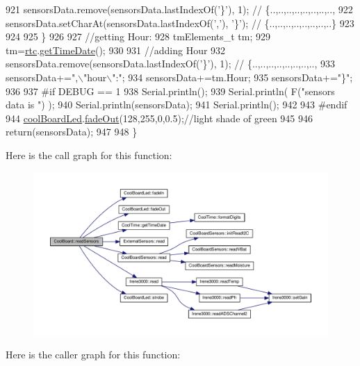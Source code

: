 \begin{DoxyCode}
921         sensorsData.remove(sensorsData.lastIndexOf(\textcolor{charliteral}{'\}'}), 1); \textcolor{comment}{// \{..,..,..,..,..,..,..,..,}
922         sensorsData.setCharAt(sensorsData.lastIndexOf(\textcolor{charliteral}{','}), \textcolor{charliteral}{'\}'}); \textcolor{comment}{// \{..,..,..,..,..,..,..,..\}      }
923         
924         
925     \}
926 
927     \textcolor{comment}{//getting Hour:}
928     tmElements\_t tm;
929     tm=\hyperlink{classCoolBoard_a50d2a6716879d64a85f3c6b44ad63275}{rtc}.\hyperlink{classCoolTime_a7a7501c5ca77dd1248bea704c44f986c}{getTimeDate}();
930     
931     \textcolor{comment}{//adding Hour}
932     sensorsData.remove(sensorsData.lastIndexOf(\textcolor{charliteral}{'\}'}), 1); \textcolor{comment}{// \{..,..,..,..,..,..,..,..,   }
933     sensorsData+=\textcolor{stringliteral}{",\(\backslash\)"hour\(\backslash\)":"};  
934     sensorsData+=tm.Hour;
935     sensorsData+=\textcolor{stringliteral}{"\}"};
936     
937 \textcolor{preprocessor}{#if DEBUG == 1}
938     Serial.println();
939     Serial.println( F(\textcolor{stringliteral}{"sensors data is "}) );
940     Serial.println(sensorsData);
941     Serial.println();
942 
943 \textcolor{preprocessor}{#endif}
944     \hyperlink{classCoolBoard_a1b1d3c684a5baa56b08486e192fd8e97}{coolBoardLed}.\hyperlink{classCoolBoardLed_a93d545679237e8cc858324367149775c}{fadeOut}(128,255,0,0.5);\textcolor{comment}{//light shade of green}
945 
946     \textcolor{keywordflow}{return}(sensorsData);
947 
948 \}
\end{DoxyCode}
Here is the call graph for this function\+:\nopagebreak
\begin{figure}[H]
\begin{center}
\leavevmode
\includegraphics[width=350pt]{classCoolBoard_ad03abdce2e65f520bbf2cff0f2d083cf_cgraph}
\end{center}
\end{figure}
Here is the caller graph for this function\+:\nopagebreak
